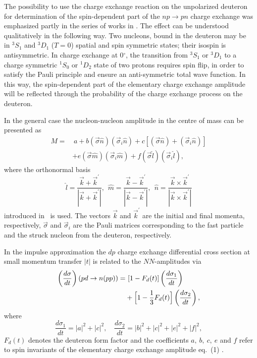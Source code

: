 \documentclass[epj]{svjour}
\begin{document}
The possibility to use the charge exchange reaction on the unpolarized deuteron
for determination of the spin-dependent part of the $np\to pn$ charge exchange
was emphasized partly in the series of works in
\cite{Mig,Pom,Lap,Dean1,Dean2,Bugg}. The effect can be understood qualitatively
in the following way. Two nucleons, bound in the deuteron may be in $^{3}S_{1}$
and $^{3}D_{1}$ ($T=0$) spatial and spin symmetric states; their isospin is
antisymmetric. In charge exchange at 0$^{\circ}$, the transition from
$^{3}S_{1}$ or $^{3}D_{1}$ to a charge symmetric $^{1}S_{0}$ or $^{1}D_{2}$
state of two protons requires spin flip, in order to satisfy the Pauli principle
and ensure an anti-symmetric total wave function. In this way, the
spin-dependent part of the elementary charge exchange amplitude will be
reflected through the probability of the charge exchange process on the
deuteron.

In the general case the nucleon-nucleon amplitude in the centre of mass can be
presented as
\begin{equation}
  \begin{split}
    M=&\ a+b(\vec\sigma \hat n)(\vec\sigma _i \hat n)+
    c[(\vec\sigma \hat n)+(\vec\sigma _i \hat n)]\\&+
    e(\vec\sigma \hat m)(\vec\sigma _i \hat m)+
    f(\vec\sigma \hat l)(\vec\sigma _i \hat l),
  \end{split}
\end{equation}
where the orthonormal basis
\begin{equation}
  \hat l =\frac {\vec k +\vec k^\prime}{|\vec k +\vec k^\prime|},~~
  \hat m =\frac {\vec k -\vec k^\prime}{|\vec k -\vec k^\prime|},~~
  \hat n =\frac {\vec k \times\vec k^\prime}{|\vec k \times\vec k^\prime|}
\end{equation}
introduced in~\cite{Gold} is used. The vectors $\vec k$ and $\vec k^\prime$ are
the initial and final momenta, respectively, $\vec\sigma $ and $\vec\sigma_i$
are the Pauli matrices corresponding to the fast particle and the struck nucleon
from the deuteron, respectively.

In the impulse approximation the $dp$ charge exchange differential cross section
at small momentum transfer $|t|$ is related to the $NN$-amplitudes via
\begin{equation}
  \begin{split}
    \left( \frac{d\sigma }{dt}\right) (pd\rightarrow n(pp))=&\ [1-F_d(t)]\left(
      \frac{d\sigma _1}{dt}\right)\\&+ \Bigl[1-\frac{1}{3}F_d(t)\Bigr]
    \left(\frac{d\sigma _2}{dt}\right),
  \end{split}
\end{equation}
where
\begin{equation}
  \frac{d\sigma _1}{dt}=|a|^2+|c|^2,\quad
  \frac{d\sigma _2}{dt}=|b|^2+|c|^2+|e|^2+|f|^2,
\end{equation}
$F_d (t)$ denotes the deuteron form factor and the coefficients $a,~b,~c,~e$ and
$f$ refer to spin invariants of the elementary charge exchange amplitude eq.~(1)
\cite{Dean1,Ala}.
\end{document}
